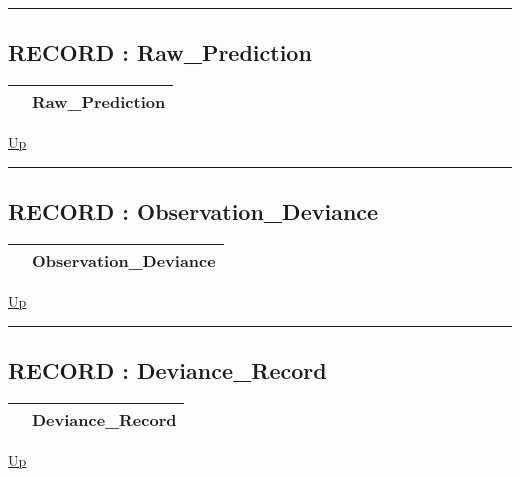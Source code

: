 \rule{\textwidth}{0.4pt}
\subsection*{RECORD : Raw\_Prediction}
\hypertarget{ecldoc:logisticregression.types.raw_prediction}{}

{\renewcommand{\arraystretch}{1.5}
\begin{tabularx}{\textwidth}{|>{\raggedright\arraybackslash}l|X|}
\hline
\hspace{0pt} & Raw\_Prediction \\
\hline
\end{tabularx}
}

\hyperlink{ecldoc:LogisticRegression.Types}{Up}

\par


\rule{\textwidth}{0.4pt}
\subsection*{RECORD : Observation\_Deviance}
\hypertarget{ecldoc:logisticregression.types.observation_deviance}{}

{\renewcommand{\arraystretch}{1.5}
\begin{tabularx}{\textwidth}{|>{\raggedright\arraybackslash}l|X|}
\hline
\hspace{0pt} & Observation\_Deviance \\
\hline
\end{tabularx}
}

\hyperlink{ecldoc:LogisticRegression.Types}{Up}

\par


\rule{\textwidth}{0.4pt}
\subsection*{RECORD : Deviance\_Record}
\hypertarget{ecldoc:logisticregression.types.deviance_record}{}

{\renewcommand{\arraystretch}{1.5}
\begin{tabularx}{\textwidth}{|>{\raggedright\arraybackslash}l|X|}
\hline
\hspace{0pt} & Deviance\_Record \\
\hline
\end{tabularx}
}

\hyperlink{ecldoc:LogisticRegression.Types}{Up}

\par



